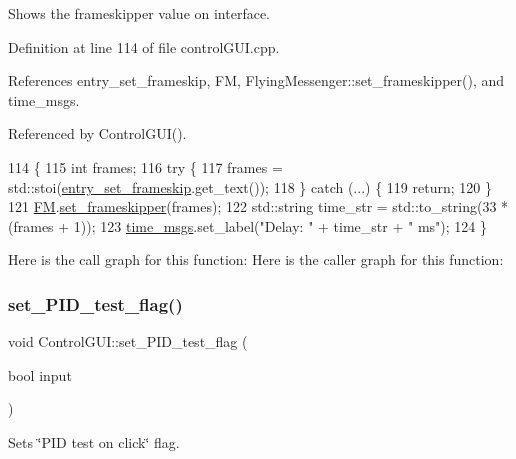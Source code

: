 Shows the frameskipper value on interface. 



Definition at line 114 of file control\+G\+U\+I.\+cpp.



References entry\+\_\+set\+\_\+frameskip, FM, Flying\+Messenger\+::set\+\_\+frameskipper(), and time\+\_\+msgs.



Referenced by Control\+G\+U\+I().


\begin{DoxyCode}
114                                   \{
115     \textcolor{keywordtype}{int} frames;
116     \textcolor{keywordflow}{try} \{
117         frames = std::stoi(\hyperlink{class_control_g_u_i_a108e4158252832d9f53570b9c21b8ced}{entry\_set\_frameskip}.get\_text());
118     \} \textcolor{keywordflow}{catch} (...) \{
119         \textcolor{keywordflow}{return};
120     \}
121     \hyperlink{class_control_g_u_i_a16612b604257a888faac7a1d7e9e3e51}{FM}.\hyperlink{class_flying_messenger_adc63fb3138c384505382a170729c5c1c}{set\_frameskipper}(frames);
122     std::string time\_str = std::to\_string(33 * (frames + 1));
123     \hyperlink{class_control_g_u_i_a2816137ab08d4362af2418e73e1dcfb3}{time\_msgs}.set\_label(\textcolor{stringliteral}{"Delay: "} + time\_str + \textcolor{stringliteral}{" ms"});
124 \}
\end{DoxyCode}
Here is the call graph for this function\+:
Here is the caller graph for this function\+:
\mbox{\label{class_control_g_u_i_abe424a7edef9b3a15cdc8a2b2324120a}} 
\subsubsection{\texorpdfstring{set\+\_\+\+P\+I\+D\+\_\+test\+\_\+flag()}{set\_PID\_test\_flag()}}
{\footnotesize\ttfamily void Control\+G\+U\+I\+::set\+\_\+\+P\+I\+D\+\_\+test\+\_\+flag (\begin{DoxyParamCaption}\item[{bool}]{input }\end{DoxyParamCaption})}



Sets \char`\"{}\+P\+I\+D test on click\char`\"{} flag. 


